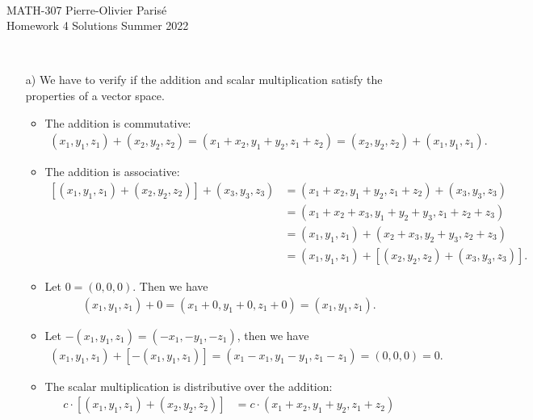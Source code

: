 \documentclass[12pt]{article}
\newcommand{\spc}{\vspace*{0.5cm}}
\newcommand{\exo}[2]{\noindent\textcolor{red}{\fbox{\textbf{Section {#1}, Problem {#2}}}}\\}
\begin{document}
	\noindent \hrulefill \\
	MATH-307 \hfill Pierre-Olivier Paris{\'e}\\
	Homework 4 Solutions \hfill Summer 2022\\\vspace*{-0.7cm}
	
	\noindent\hrulefill
	
	\spc
	
	\exo{2.1}{4}
	
	\begin{enumerate}
	\item[a)] We have to verify if the addition and scalar multiplication satisfy the properties of a vector space.
		\begin{itemize}
		\item The addition is commutative:
			\begin{align*}
			(x_1 , y_1 , z_1 ) + (x_2 , y_2 , z_2) = (x_1 + x_2 , y_1 + y_2 , z_1 + z_2) = (x_2, y_2 , z_2) + (x_1 , y_1 , z_1 ) .
			\end{align*}
		\item The addition is associative:
			\begin{align*}
			\left[ (x_1, y_1 , z_1 ) + (x_2 , y_2 , z_2) \right] + (x_3 , y_3 , z_3) &= (x_1 + x_2 , y_1 + y_2 , z_1 + z_2 ) + (x_3 , y_3 , z_3 ) \\
			&= (x_1 + x_2 + x_3 , y_1 + y_2 + y_3 , z_1 + z_2 + z_3 ) \\
			&= (x_1 , y_1 , z_1) + (x_2 + x_3 , y_2 + y_3 , z_2 + z_3) \\
			&= (x_1 , y_1 , z_1 ) + \left[ (x_2 , y_2 , z_2 ) + (x_3 , y_3 , z_3 ) \right] .
			\end{align*}
		\item Let $0 = (0, 0, 0)$. Then we have
			\begin{align*}
			(x_1, y_1 , z_1) + 0 = (x_1 + 0 , y_1 + 0 , z_1 + 0 ) = (x_1 , y_1 , z_1) .
			\end{align*}
		\item Let $-(x_1, y_1 , z_1) = (-x_1 , -y_1 , -z_1)$, then we have
			\begin{align*}
			(x_1 , y_1 , z_1) + \left[ -(x_1, y_1,z_1) \right] = (x_1 - x_1, y_1 - y_1 , z_1 - z_1 ) = (0, 0, 0) = 0 .
			\end{align*}
		\item The scalar multiplication is distributive over the addition:
			\begin{align*}
			c \cdot \left[ (x_1 , y_1 , z_1 ) + (x_2 , y_2 , z_2) \right] &= c \cdot (x_1 + x_2 , y_1 + y_2 , z_1 + z_2 ) \\

\end{align*}
\end{itemize}
\end{enumerate}
\end{document}
